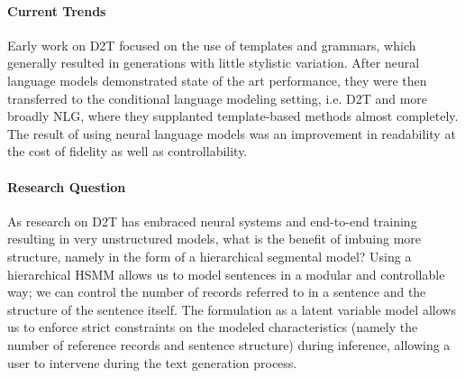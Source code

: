 \documentclass[11pt]{article}
\begin{document}
\paragraph{Current Trends}
Early work on D2T focused on the use of templates and grammars, 
which generally resulted in generations with little stylistic variation.
After neural language models demonstrated state of the art performance,
they were then transferred to the conditional language modeling setting,
i.e. D2T and more broadly NLG,
where they supplanted template-based methods almost completely.
The result of using neural language models was an improvement in readability
at the cost of fidelity as well as controllability.

\paragraph{Research Question}
As research on D2T has embraced neural systems and end-to-end training resulting
in very unstructured models, what is the benefit of imbuing more structure, namely in the
form of a hierarchical segmental model?
Using a hierarchical HSMM allows us to model
sentences in a modular and controllable way;
we can control the number of records referred to in a sentence and 
the structure of the sentence itself.
The formulation as a latent variable model allows us to enforce strict constraints on
the modeled characteristics (namely the number of reference records and sentence structure)
during inference, allowing a user to intervene during the text generation process.
\end{document}
